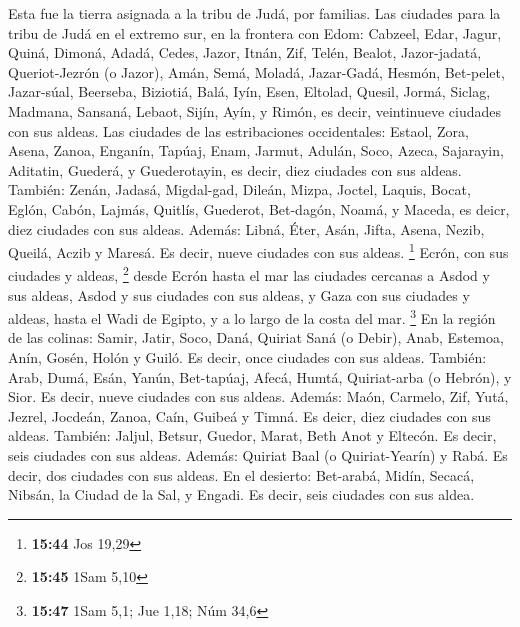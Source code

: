  Esta fue la tierra asignada a la tribu de Judá, por
familias.  Las ciudades para la tribu de Judá en el
extremo sur, en la frontera con Edom: Cabzeel, Edar, Jagur,
 Quiná, Dimoná, Adadá,  Cedes, Jazor,
Itnán,  Zif, Telén, Bealot,  Jazor-jadatá,
Queriot-Jezrón (o Jazor),  Amán, Semá, Moladá,
 Jazar-Gadá, Hesmón, Bet-pelet, 
Jazar-súal, Beerseba, Biziotiá,  Balá, Iyín, Esen,
 Eltolad, Quesil, Jormá,  Siclag, Madmana,
Sansaná,  Lebaot, Sijín, Ayín, y Rimón, es decir,
veintinueve ciudades con sus aldeas.  Las ciudades de las
estribaciones occidentales: Estaol, Zora, Asena,  Zanoa,
Enganín, Tapúaj, Enam,  Jarmut, Adulán, Soco, Azeca,
 Sajarayin, Aditatin, Guederá, y Guederotayin, es decir,
diez ciudades con sus aldeas.  También: Zenán, Jadasá,
Migdal-gad,  Dileán, Mizpa, Joctel, 
Laquis, Bocat, Eglón,  Cabón, Lajmás, Quitlís,
 Guederot, Bet-dagón, Noamá, y Maceda, es deicr, diez
ciudades con sus aldeas.  Además: Libná, Éter, Asán,
 Jifta, Asena, Nezib,  Queilá, Aczib y
Maresá. Es decir, nueve ciudades con sus aldeas. \footnote{\textbf{15:44}
  Jos 19,29}  Ecrón, con sus ciudades y aldeas,
\footnote{\textbf{15:45} 1Sam 5,10}  desde Ecrón hasta el
mar las ciudades cercanas a Asdod y sus aldeas,  Asdod y
sus ciudades con sus aldeas, y Gaza con sus ciudades y aldeas, hasta el
Wadi de Egipto, y a lo largo de la costa del mar. \footnote{\textbf{15:47}
  1Sam 5,1; Jue 1,18; Núm 34,6}  En la región de las
colinas: Samir, Jatir, Soco,  Daná, Quiriat Saná (o
Debir),  Anab, Estemoa, Anín,  Gosén,
Holón y Guiló. Es decir, once ciudades con sus aldeas. 
También: Arab, Dumá, Esán,  Yanún, Bet-tapúaj, Afecá,
 Humtá, Quiriat-arba (o Hebrón), y Sior. Es decir, nueve
ciudades con sus aldeas.  Además: Maón, Carmelo, Zif,
Yutá,  Jezrel, Jocdeán, Zanoa,  Caín,
Guibeá y Timná. Es deicr, diez ciudades con sus aldeas. 
También: Jaljul, Betsur, Guedor,  Marat, Beth Anot y
Eltecón. Es decir, seis ciudades con sus aldeas.  Además:
Quiriat Baal (o Quiriat-Yearín) y Rabá. Es decir, dos ciudades con sus
aldeas.  En el desierto: Bet-arabá, Midín, Secacá,
 Nibsán, la Ciudad de la Sal, y Engadi. Es decir, seis
ciudades con sus aldea.

